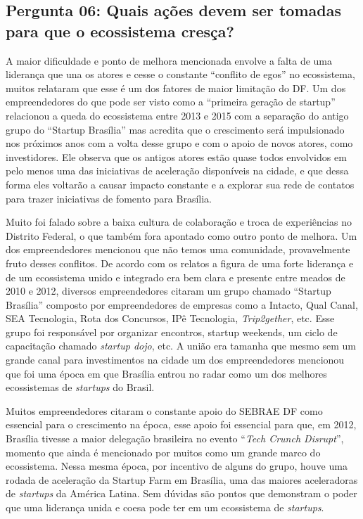 \subsection*{Pergunta 06: Quais ações devem ser tomadas para que o ecossistema cresça?}
\label{subsection:pergunta_de_pesquisa_6}

A maior dificuldade e ponto de melhora mencionada envolve a falta de uma liderança que una os atores e cesse o constante ``conflito de egos'' no ecossistema, muitos relataram que esse é um dos fatores de maior limitação do DF. Um dos empreendedores do que pode ser visto como a ``primeira geração de startup'' relacionou a queda do ecossistema entre 2013 e 2015 com a separação do antigo grupo do ``Startup Brasília'' mas acredita que o crescimento será impulsionado nos próximos anos com a volta desse grupo e com o apoio de novos atores, como investidores. Ele observa que os antigos atores estão quase todos envolvidos em pelo menos uma das iniciativas de aceleração disponíveis na cidade, e que dessa forma eles voltarão a causar impacto constante e a explorar sua rede de contatos para trazer iniciativas de fomento para Brasília.  

Muito foi falado sobre a baixa cultura de colaboração e troca de experiências no Distrito Federal, o que também fora apontado como outro ponto de melhora. Um dos empreendedores mencionou que não temos uma comunidade, provavelmente fruto desses conflitos. De acordo com os relatos a figura de uma forte liderança e de um ecossistema unido e integrado era bem clara e presente entre meados de 2010 e 2012, diversos empreendedores citaram um grupo chamado ``Startup Brasília'' composto por empreendedores de empresas como a Intacto, Qual Canal, SEA Tecnologia, Rota dos Concursos, IPê Tecnologia, \textit{Trip2gether}, etc. Esse grupo foi responsável por organizar encontros, startup weekends, um ciclo de capacitação chamado \textit{startup dojo}, etc. A união era tamanha que mesmo sem um grande canal para investimentos na cidade um dos empreendedores mencionou que foi uma época em que Brasília entrou no radar como um dos melhores ecossistemas de \textit{startups} do Brasil. 

Muitos empreendedores citaram o constante apoio do SEBRAE DF como essencial para o crescimento na época, esse apoio foi essencial para que, em 2012, Brasília tivesse a maior delegação brasileira no evento ``\textit{Tech Crunch Disrupt}'', momento que ainda é mencionado por muitos como um grande marco do ecossistema. Nessa mesma época, por incentivo de alguns do grupo, houve uma rodada de aceleração da Startup Farm em Brasília, uma das maiores aceleradoras de \textit{startups} da América Latina. Sem dúvidas são pontos que demonstram o poder que uma liderança unida e coesa pode ter em um ecossistema de \textit{startups}. 

